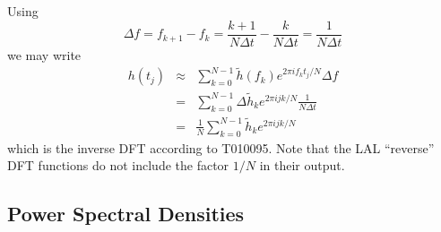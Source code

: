 Using
\begin{equation}
\Delta f = f_{k+1} - f_k = \frac{k+1}{N\Delta t} - \frac{k}{N\Delta t} =
\frac{1}{N\Delta t}
\end{equation}
we may write
\begin{eqnarray}
h(t_j) &\approx& \sum_{k=0}^{N-1} \tilde{h}(f_k) e^{2 \pi i f_k t_j / N}
\Delta f \\
&=& \sum_{k=0}^{N-1} \Delta \tilde{h}_k e^{2 \pi i j k / N}\frac{1}{N\Delta t}
\\
&=& \frac{1}{N} \sum_{k=0}^{N-1} \tilde{h}_k e^{2 \pi i j k / N}
\end{eqnarray}
which is the inverse DFT according to T010095. Note that the LAL ``reverse''
DFT functions do not include the factor $1/N$ in their output.

\subsection{Power Spectral Densities}

